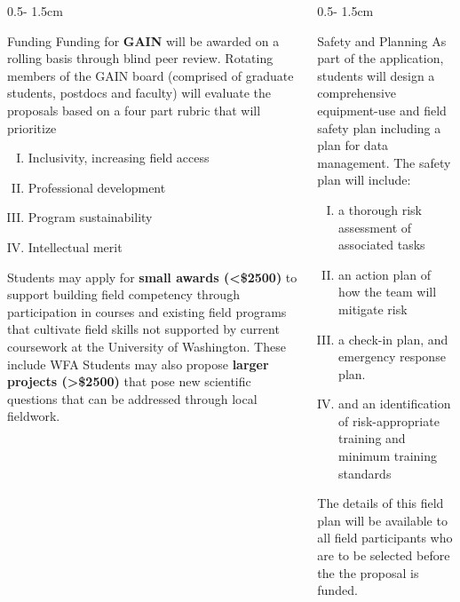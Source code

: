 \documentclass{uwposter}
\begin{document}
\begin{frame}
\begin{columns}[onlytextwidth]
\begin{column}{0.5\textwidth - 1.5cm}
\begin{block}{Funding}
        Funding for \textbf{\alert{GAIN}} will be awarded on a rolling basis through blind peer review. Rotating members of the GAIN board (comprised of graduate students, postdocs and faculty) will evaluate the proposals based on a four part rubric that will prioritize 
        \begin{enumerate}[I.]
        \item
        Inclusivity, increasing field access
        \item
        Professional development
        \item
        Program sustainability 
        \item
        Intellectual merit
        \end{enumerate}

        Students may apply for \textbf{small awards (\alert{<\$2500})} to support building field competency through participation in courses and existing field programs that cultivate field skills not supported by current coursework at the University of Washington.
        These include WFA
        Students may also propose \textbf{larger projects (\alert{>\$2500})} that pose new scientific questions that can be addressed through local fieldwork.
        

    \end{block}

\end{column}


\begin{column}{0.5\textwidth - 1.5cm}
       \begin{block}{Safety and Planning}
    As part of the application, students will design a comprehensive equipment-use and field safety plan including a plan for data management. The safety plan will include:
        \begin{enumerate}[I.]
         \item
    	a thorough risk assessment of associated tasks
    	\item
	an action plan of how the team will mitigate risk
    	\item
	a check-in plan, and emergency response plan.
    	\item
	and an identification of risk-appropriate training and minimum training standards
	\end{enumerate}
	
	The details of this field plan will be available to all field participants who are to be selected before the the proposal is funded.
    \end{block}
    

\end{column}
\end{columns}
\end{frame}
\end{document}
